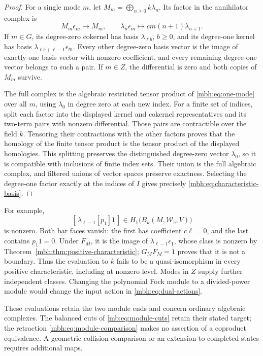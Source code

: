 \begin{proof}
For a single mode \(m\), let
\(M_m=\bigoplus_{n\ge0}k\lambda_n\).
Its factor in the annihilator complex is
\begin{equation}\label{mbh:eq:one-mode}
 M_m\epsilon_m\longrightarrow M_m,\qquad
 \lambda_n\epsilon_m\longmapsto cm(n+1)\lambda_{n+1}.
\end{equation}
If \(m\in G\), its degree-zero cokernel has basis
\(\lambda_{\ell b}\), \(b\ge0\), and its degree-one kernel
has basis \(\lambda_{\ell b+\ell-1}\epsilon_m\).
Every other degree-zero basis vector is the image of exactly one
basis vector with nonzero coefficient, and every remaining
degree-one vector belongs to such a pair.
If \(m\in Z\), the differential is zero and both copies of
\(M_m\) survive.

The full complex is the algebraic restricted tensor product of
\eqref{mbh:eq:one-mode} over all \(m\), using \(\lambda_0\)
in degree zero at each new index.  For a finite set of indices,
split each factor into the displayed kernel and cokernel
representatives and its two-term pairs with nonzero differential.
Those pairs are contractible over the field \(k\).  Tensoring their
contractions with the other factors proves that the homology of the
finite tensor product is the tensor product of the displayed
homologies.  This splitting preserves the distinguished
degree-zero vector \(\lambda_0\), so it is compatible with
inclusions of finite index sets.  Their union is the full
algebraic complex, and filtered unions of vector spaces preserve
exactness.  Selecting the degree-one factor exactly at the indices
of \(I\) gives precisely \eqref{mbh:eq:characteristic-basis}.
\end{proof}

For example,
\[
 [\,\lambda_{\ell-1}[p_1]1\,]
   \in H_1\bigl(B_k(M,\mathscr W_c,V)\bigr)
\]
is nonzero.  Both bar faces vanish: the first has coefficient
\(c\ell=0\), and the last contains \(p_1 1=0\).
Under \(F_M\), it is the image of
\(\lambda_{\ell-1}\epsilon_1\), whose class is nonzero by
Theorem~\ref{mbh:thm:positive-characteristic};
\(G_MF_M=1\) proves that it is not a boundary.
Thus the evaluation to \(k\) fails to be a quasi-isomorphism
in every positive characteristic, including at nonzero level.
Modes in \(Z\) supply further independent classes.
Changing the polynomial Fock module to a divided-power module
would change the input action in \eqref{mbh:eq:dual-actions}.

These evaluations retain the two module ends and concern ordinary
algebraic complexes.  The balanced cuts of
\eqref{mb:eq:module-cuts} retain their stated target; the
retraction \eqref{mbh:eq:module-comparison} makes no assertion
of a coproduct equivalence.  A geometric collision comparison
or an extension to completed states requires additional maps.
